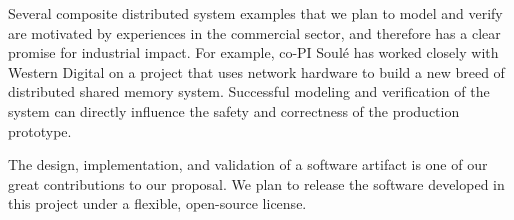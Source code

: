 Several composite distributed system examples that we plan to model
and verify are motivated by experiences in the commercial sector, 
and therefore has a clear promise for industrial impact. 
For example, co-PI Soul\'{e} has worked closely with Western Digital 
on a project that uses network hardware to build a new breed of 
distributed shared memory system. Successful modeling and
verification of the system can directly influence the safety and 
correctness of the production prototype. 

The design, implementation, and validation of a software artifact 
is one of our great contributions to our proposal. 
We plan to release the software developed in this project under 
a flexible, open-source license.

